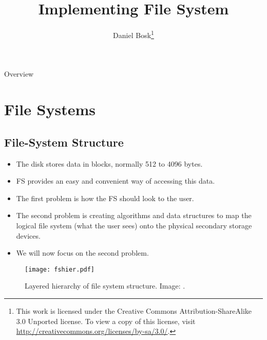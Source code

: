 \documentclass{beamer}
\title{%
  Implementing File System
}
\author{Daniel Bosk\footnote{%
	\tiny
  This work is licensed under the Creative Commons Attribution-ShareAlike 3.0 
  Unported license.
	To view a copy of this license, visit 
	\url{http://creativecommons.org/licenses/by-sa/3.0/}.
}}
\institute[MIUN ICS]{%
  Department of Information and Communication Systems (ICS),\\
  Mid Sweden University, Sundsvall.
}
\date{\svnId}
\begin{document}
\begin{frame}
  \titlepage
\end{frame}

\begin{frame}{Overview}
	\tableofcontents
\end{frame}




\section{File Systems}

\subsection{File-System Structure}

\begin{frame}{\insertsubsectionhead}
  \begin{itemize}
    \item The disk stores data in blocks, normally 512 to 4096 bytes.

    \item FS provides an easy and convenient way of accessing this data.

    \item The first problem is how the FS should look to the user.

    \item The second problem is creating algorithms and data structures to map 
      the logical file system (what the user sees) onto the physical secondary 
      storage devices.

    \item We will now focus on the second problem.

  \end{itemize}
\end{frame}

\begin{frame}{\insertsubsectionhead}
  \begin{figure}
    \texttt{[image: fshier.pdf]}
    \caption{Layered hierarchy of file system structure.
      Image: \cite{Silberschatz2013osc}.}
  \end{figure}
\end{frame}
\end{document}
